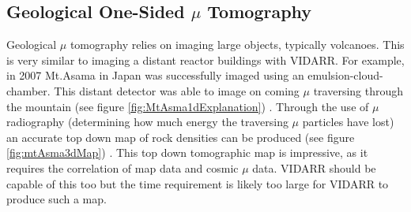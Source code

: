 
\subsection{Geological One-Sided $\mu$ Tomography}  \label{sec:geologicalTomography} %
Geological $\mu$ tomography relies on imaging large objects, typically volcanoes. This is very similar to imaging a distant reactor buildings with VIDARR. For example, in 2007 Mt.Asama in Japan was successfully imaged using an emulsion-cloud-chamber. This distant detector was able to image on coming $\mu$ traversing through the mountain (see figure \ref{fig:MtAsma1dExplanation}) \cite{Tanaka_mtAsama_2007}. Through the use of $\mu$ radiography (determining how much energy the traversing $\mu$ particles have lost) an accurate top down map of rock densities can be produced (see figure \ref{fig:mtAsma3dMap}) \cite{Tanaka_mtAsama_2007}. This top down tomographic map is impressive, as it requires the correlation of map data and cosmic $\mu$ data. VIDARR should be capable of this too but the time requirement is likely too large for VIDARR to produce such a map. 

